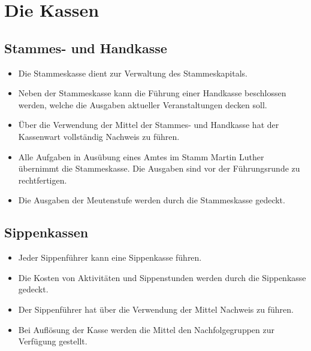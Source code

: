 \documentclass[a4paper]{article}
\begin{document}

\section{Die Kassen} %
\label{sec:die_kassen}

    \subsection{Stammes- und Handkasse} %
    \label{sub:stammes_und_handkasse}
	\begin{itemize}
		\item Die Stammeskasse dient zur Verwaltung des Stammeskapitals. 
		\item Neben der Stammeskasse kann die Führung einer Handkasse beschlossen werden, welche die Ausgaben aktueller Veranstaltungen decken soll. 
		\item Über die Verwendung der Mittel der Stammes- und Handkasse hat der Kassenwart vollständig Nachweis zu führen. 
		\item Alle Aufgaben in Ausübung eines Amtes im Stamm Martin Luther übernimmt die Stammeskasse. Die Ausgaben sind vor der Führungsrunde zu rechtfertigen. 
		\item Die Ausgaben der Meutenstufe werden durch die Stammeskasse gedeckt. 
	\end{itemize}

    \subsection{Sippenkassen} %
    \label{sub:sippenkassen}
	\begin{itemize}
		\item Jeder Sippenführer kann eine Sippenkasse führen. 
		\item Die Kosten von Aktivitäten und Sippenstunden werden durch die Sippenkasse gedeckt. 
		\item Der Sippenführer hat über die Verwendung der Mittel Nachweis zu führen. 
		\item Bei Auflösung der Kasse werden die Mittel den Nachfolgegruppen zur Verfügung gestellt. 
	\end{itemize}
\end{document}
